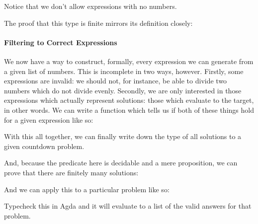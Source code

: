 
Notice that we don't allow expressions with no numbers.

The proof that this type is finite mirrors its definition closely:


\paragraph{Filtering to Correct Expressions}
We now have a way to construct, formally, every expression we can generate from
a given list of numbers.
This is incomplete in two ways, however.
Firstly, some expressions are invalid: we should not, for instance, be able to
divide two numbers which do not divide evenly.
Secondly, we are only interested in those expressions which actually represent
solutions: those which evaluate to the target, in other words.
We can write a function which tells us if both of these things hold for a given
expression like so:

\begin{minipage}{\linewidth}
  \begin{multicols}{2}
    
     \columnbreak
    
    
  \end{multicols} \vspace{\baselineskip}
\end{minipage}

With this all together, we can finally write down the type of all solutions to a
given countdown problem.


And, because the predicate here is decidable and a mere proposition, we can
prove that there are finitely many solutions:


And we can apply this to a particular problem like so:


Typecheck this in Agda and it will evaluate to a list of the valid answers for
that problem.

